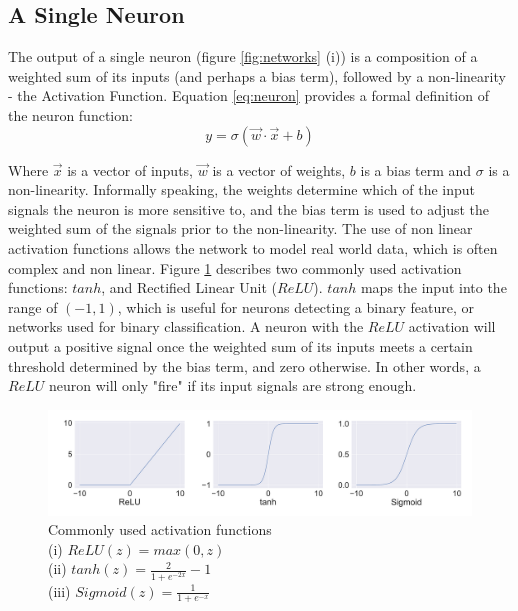 \medskip

\subsection{A Single Neuron}

The output of a single neuron (figure \ref{fig:networks} (i)) is a composition of a weighted sum of its inputs (and perhaps a bias term), followed by a non-linearity - the Activation Function. Equation \ref{eq:neuron} provides a formal definition of the neuron function:
\begin{equation}
y = \sigma(\vec{w}\cdot\vec{x} + b)
\label{eq:neuron}
\end{equation}

Where \(\vec{x}\) is a vector of inputs, \(\vec{w}\) is a vector of weights, \(b\) is a bias term and \(\sigma\) is a non-linearity. Informally speaking, the weights determine which of the input signals the neuron is more sensitive to, and the bias term is used to adjust the weighted sum of the signals prior to the non-linearity. The use of non linear activation functions allows the network to model real world data, which is often complex and non linear. Figure \ref{fig:activations} describes two commonly used activation functions: $tanh$, and Rectified Linear Unit ($ReLU$). $tanh$ maps the input into the range of $(-1,1)$, which is useful for neurons detecting a binary feature, or networks used for binary classification. A neuron with the $ReLU$ activation will output a positive signal once the weighted sum of its inputs meets a certain threshold determined by the bias term, and zero otherwise. In other words, a $ReLU$ neuron will only "fire" if its input signals are strong enough. 

\begin{figure}
  \centering
    \includegraphics[width=\textwidth]{Figures/activations.pdf}
  \caption{
  Commonly used activation functions \\
  (i) $ ReLU(z) = max(0, z) $\\ 
  (ii) $ tanh(z) = \frac{2}{1 + e^{-2x}} - 1 $ \\
  (iii) $ Sigmoid(z) = \frac{1}{1 + e^{-x}} $ \\
  }
  \label{fig:activations}
\end{figure}

